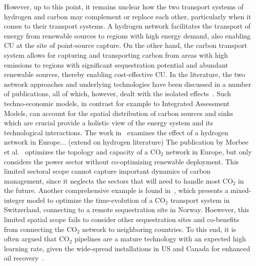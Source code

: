 \documentclass[twocolumn]{article}
\newcommand{\carbon}{CO$_2$}
\begin{document}
However, up to this point, it remains unclear how the two transport systems of hydrogen and carbon may complement or replace each other, particularly when it comes to their transport systems. A hydrogen network facilitates the transport of energy from renewable sources to regions with high energy demand, also enabling CU at the site of point-source capture. On the other hand, the carbon transport system allows for capturing and transporting carbon from areas with high emissions to regions with significant sequestration potential and abundant renewable sources, thereby enabling cost-effective CU.
In the literature, the two network approaches and underlying technologies have been discussed in a number of publications, all of which, however, dealt with the isolated effects~\cite{bakkenLinearModelsOptimization2008,morbeeOptimisedDeploymentEuropean2012,stewartFeasibilityEuropeanwideIntegrated2014,oeiModelingCarbonCapture2014,elahiMultiperiodLeastCost2014,burandtDecarbonizingChinaEnergy2019,middletonSimCCSOpensourceTool2020,bjerketvedtOptimalDesignCost2020,weiProposedGlobalLayout2021,damoreOptimalDesignEuropean2021,becattiniCarbonDioxideCapture2022}. Such techno-economic models, in contrast for example to Integrated Assessment Models, can account for the spatial distribution of carbon sources and sinks which are crucial provide a holistic view of the energy system and its technological interactions. The work in~\cite{neumannBenefitsHydrogenNetwork2022} examines the effect of a hydrogen network in Europe... (extend on hydrogen literature)
The publication by Morbee et al.~\cite{morbeeOptimisedDeploymentEuropean2012} optimizes the topology and capacity of a \carbon{} network in Europe, but only considers the power sector without co-optimizing renewable deployment. This limited sectoral scope cannot capture important dynamics of carbon management, since it neglects the sectors that will need to handle most \carbon{} in the future.
Another comprehensive example is found in~\cite{becattiniCarbonDioxideCapture2022}, which presents a mixed-integer model to optimize the time-evolution of a \carbon{} transport system in Switzerland, connecting to a remote sequestration site in Norway. Hoewever, this limited spatial scope fails to consider other sequestration sites and co-benefits from connecting the \carbon{} network to neighboring countries. To this end, it is often argued that \carbon{} pipelines are a mature technology with an expected high learning rate, given the wide-spread installations in US and Canada for enhanced oil recovery~\cite{righettiSitingCarbonDioxide2017,friedmannNETZEROGEOSPHERICRETURN}.
\end{document}

